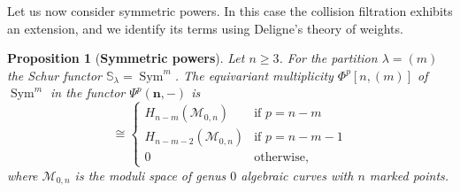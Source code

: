 \documentclass[12pt]{article}
\newcommand{\Schur}[1]{\mathbb{S}_{#1}}
\newcommand{\n}[1][n]{\mathbf{#1}}
\newcommand{\ModuliCurve}[1]{\mathcal{M}_{#1}}
\DeclareMathOperator{\Sym}{Sym}
\theoremstyle{plain}
\newtheorem{prop}[thm]{Proposition}
\theoremstyle{definition}
\theoremstyle{remark}
\begin{document}
Let us now consider symmetric powers. In this case the collision filtration exhibits an extension, and we identify its terms using Deligne's theory of weights.

\begin{prop}[\textbf{Symmetric powers}]\label{prop:symmetric powers}
    Let $n\geq 3$. For the partition $\lambda = (m)$ the Schur functor $\Schur{\lambda} = \Sym^m$. The equivariant multiplicity $\Phi^p[n,(m)]$ of $\Sym^m$ in the functor $\Psi^p(\n,-)$ is
\begin{equation}
    \cong
    \begin{cases} 
    H_{n-m}(\ModuliCurve{0,n}) & \text{if }p=n-m \\
    H_{n-m-2}(\ModuliCurve{0,n}) & \text{if }p=n-m-1 \\
    0 & \text{otherwise},
    \end{cases}
\end{equation}
where $\ModuliCurve{0,n}$ is the moduli space of genus $0$ algebraic curves with $n$ marked points.
\end{prop}
\end{document}
